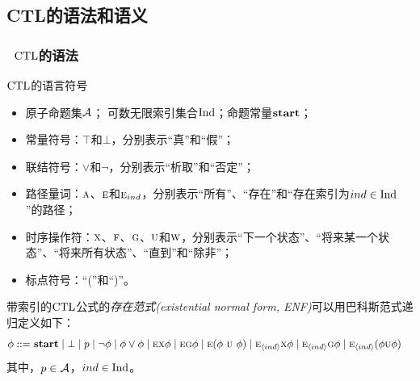 \documentclass[9pt, CJK]{beamer}
\begin{document}
	\subsection{CTL的语法和语义}
	\begin{frame} 
		\frametitle{~$\textrm{CTL}$的语法}
		{\footnotesize 
			\begin{block}{$\textrm{CTL}$的语言符号}
				\begin{itemize}
					\item 原子命题集${\cal A}$； \quad 可数无限索引集合$\textrm{Ind}$；\quad 命题常量$\textbf{start}$；
					\item 常量符号：$\top$和$\bot$，分别表示“真”和“假”；
					\item 联结符号：$\vee$和$\neg$，分别表示“析取”和“否定”；
					\item 路径量词：$\textsc{a}$、$\textsc{e}$和$\textsc{e}_{ind}$，分别表示“所有”、“存在”和“存在索引为$ind\in \textrm{Ind}$”的路径；
					\item 时序操作符：$\textsc{x}$、$\textsc{f}$、$\textsc{g}$、$\textsc{u}$和$\textsc{w}$，分别表示“下一个状态”、“将来某一个状态”、“将来所有状态”、“直到”和“除非”；
					\item 标点符号：“(”和“)”。
				\end{itemize}
			\end{block}
			\begin{definition}
				带索引的$\textrm{CTL}$公式的\emph{存在范式(existential normal form, ENF)}可以用巴科斯范式递归定义如下：
				\begin{align*}
					\phi  ::= & \ \start\mid \bot %
					\mid p \mid\neg\phi \mid \phi\lor\phi \mid
					\EXIST \NEXT \phi \mid
					\EXIST \GLOBAL \phi \mid 
					\EXIST (\phi\ \UNTILL\ \phi)\mid 
					\EXIST_{\tuple{ind}}\NEXT \phi  \mid 
					\EXIST_{\tuple{ind}}\GLOBAL \phi \mid
					\EXIST_{\tuple{ind}}(\phi \UNTILL \phi)  
				\end{align*}
				其中，$p\in {\cal A}$，$ind \in \textrm{Ind}$。
				

\end{definition}}
\end{frame}
\end{document}
